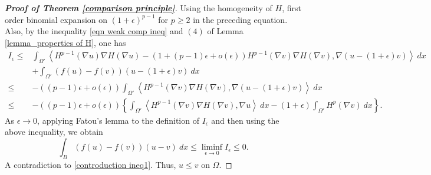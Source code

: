 \documentclass[11pt]{amsart}
\newcommand{\Fin}[1]{H^{p-1}(\nabla #1)\nabla H(\nabla #1)}
\numberwithin{equation}{section}
\begin{document}
\begin{proof}[\textbf{Proof of Theorem \ref{comparison principle}}]
Using the homogeneity of $H$, first order binomial expansion on $(1+\epsilon)^{p-1}$ for $p\geq 2$ in the preceding equation. Also, by the inequality \eqref{eqn weak comp ineq} and $(4)$ of Lemma \ref{lemma_properties of H}, one has
\begin{equation*}
    \begin{split}
        I_{\epsilon}
        \leq & \int_{\Omega'}\left<\Fin{u}-(1+(p-1)\epsilon+o(\epsilon))\Fin{v}, \nabla (u-(1+\epsilon)v)\right>\ dx\\
        &+\int_{\Omega'} \left(f(u)-f(v)\right)(u-(1+\epsilon)v)\ dx\\
        \leq &-\left((p-1)\epsilon+o(\epsilon)\right) \int_{\Omega'}\left<\Fin{v}, \nabla(u-(1+\epsilon)v)\right>\ dx\\
        \leq & -\left((p-1)\epsilon +o(\epsilon)\right)\left\{\int_{\Omega'}\left<\Fin{v}, \nabla u \right>\ dx -(1+\epsilon) \int_{\Omega'}H^{p}(\nabla v)\ dx\right\} .
    \end{split}
\end{equation*}
As $\epsilon\to 0$, applying Fatou's lemma to the definition of $I_{\epsilon}$ and then using the above inequality, we obtain 
\begin{equation}\label{contraduction ineq2}
    \int_{B}\left(f(u)-f(v)\right)(u-v)\ dx\leq \liminf_{\epsilon\to 0}I_{\epsilon}\leq 0.
\end{equation}
A contradiction to \eqref{controduction ineq1}.  Thus, $u\leq v$ on $\Omega$. 
  \end{proof}
\end{document}
